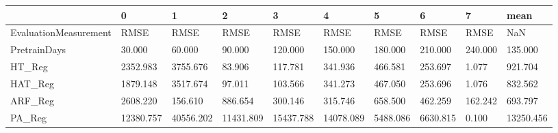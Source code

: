 \begin{tabular}{llllllllll}
\toprule
{} &         0 &         1 &         2 &         3 &         4 &        5 &        6 &       7 &      mean \\
\midrule
EvaluationMeasurement &      RMSE &      RMSE &      RMSE &      RMSE &      RMSE &     RMSE &     RMSE &    RMSE &       NaN \\
PretrainDays          &    30.000 &    60.000 &    90.000 &   120.000 &   150.000 &  180.000 &  210.000 & 240.000 &   135.000 \\
HT\_Reg                &  2352.983 &  3755.676 &    83.906 &   117.781 &   341.936 &  466.581 &  253.697 &   1.077 &   921.704 \\
HAT\_Reg               &  1879.148 &  3517.674 &    97.011 &   103.566 &   341.273 &  467.050 &  253.696 &   1.076 &   832.562 \\
ARF\_Reg               &  2608.220 &   156.610 &   886.654 &   300.146 &   315.746 &  658.500 &  462.259 & 162.242 &   693.797 \\
PA\_Reg                & 12380.757 & 40556.202 & 11431.809 & 15437.788 & 14078.089 & 5488.086 & 6630.815 &   0.100 & 13250.456 \\
\bottomrule
\end{tabular}

